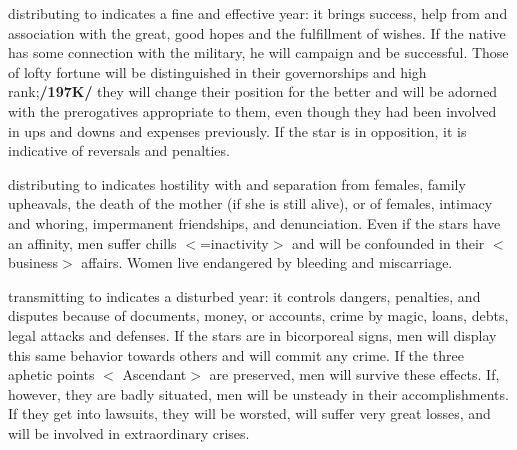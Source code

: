 \Mars\xspace distributing to \Jupiter\xspace indicates a fine and effective year: it brings success, help from and association with the great, good hopes and the fulfillment of wishes. If the native has some connection with the military, he will campaign and be successful. Those of lofty fortune will be distinguished in their governorships and high rank;\textbf{/197K/} they will change their position for the better and will be adorned with the prerogatives appropriate to them, even though they had been involved in ups and downs and expenses
previously. If the star is in opposition, it is indicative of reversals and penalties.

\Mars\xspace distributing to \Venus\xspace indicates hostility with and separation from females, family upheavals, the death of the mother (if she is still alive), or of females, intimacy and whoring, impermanent friendships, and denunciation. Even if the stars have an affinity, men suffer chills $<$=inactivity$>$ and will be confounded in their $<$business$>$ affairs. Women live endangered by bleeding and miscarriage.

\Mars\xspace transmitting to \Mercury\xspace indicates a disturbed year: it controls dangers, penalties, and disputes
because of documents, money, or accounts, crime by magic, loans, debts, legal attacks and defenses. If the stars are in bicorporeal signs, men will display this same behavior towards others and will commit any crime. If the three aphetic points $<$\Sun\xspace \Moon\xspace Ascendant$>$ are preserved, men will survive these effects. If, however, they are badly situated, men will be unsteady in their accomplishments. If they get into lawsuits, they will be worsted, will suffer very great losses, and will be involved in extraordinary crises.

\newpage
